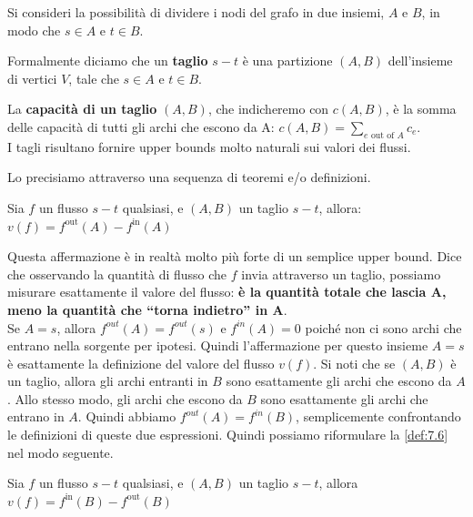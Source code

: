 \begin{myblockquote}
	Si consideri la possibilità di dividere i nodi del grafo
	in due insiemi, $A$ e $B$, in modo che $s \in A$ e $t \in B$.

	Formalmente diciamo che un \textbf{taglio} $s-t$ è una
	partizione $(A, B)$ dell'insieme di vertici $V$, tale che
	$s \in A$ e $t \in B$.

	La \textbf{capacità di un taglio} $(A, B)$, che indicheremo con $c(A , B)$, è la somma delle
	capacità di tutti gli archi che escono da A:
	$
		c(A, B) = \sum_{e \text{ out of } A} c_e.
	$\\
	I tagli risultano fornire upper bounds molto naturali sui valori dei flussi.
\end{myblockquote}

Lo precisiamo attraverso una sequenza di teoremi e/o definizioni.

\begin{myblockquote}
	\begin{minipage}{\textwidth}
		\begin{definition}\label{def:7.6}
			Sia $f$ un flusso $s-t$ qualsiasi, e $(A, B)$ un taglio $s-t$, allora:
			$
				v(f) = f^{\text{out}}(A) - f^{\text{in}}(A)
			$
		\end{definition}
	\end{minipage}
\end{myblockquote}

Questa affermazione è in realtà molto più forte di un semplice upper
bound. Dice che osservando la quantità di flusso che $f$ invia
attraverso un taglio, possiamo misurare esattamente il valore del
flusso: \textbf{è la quantità totale che lascia A, meno la quantità che
	``torna indietro'' in A}.\\

Se $A = {s}$, allora $f^{out}(A) = f^{out}(s)$ e $f^{in}(A) = 0$
poiché non ci sono archi che entrano nella sorgente per ipotesi. Quindi
l'affermazione per questo insieme $A = {s}$ è esattamente la
definizione del valore del flusso $v(f)$. Si noti che se $(A, B)$ è
un taglio, allora gli archi entranti in $B$ sono esattamente gli archi
che escono da $A$. Allo stesso modo, gli archi che escono da $B$
sono esattamente gli archi che entrano in $A$. Quindi abbiamo
$f^{out}(A) = f^{in}(B)$, semplicemente confrontando le definizioni di
queste due espressioni. Quindi possiamo riformulare la \ref{def:7.6} nel modo
seguente.

\begin{myblockquote}
	\begin{minipage}{\textwidth}
		\begin{definition}\label{def:7.7}
			Sia $f$ un flusso $s-t$ qualsiasi, e $(A, B)$ un taglio $s-t$, allora
			$
				v(f) = f^{\text{in}}(B) - f^{\text{out}}(B)
			$
		\end{definition}
	\end{minipage}
\end{myblockquote}

